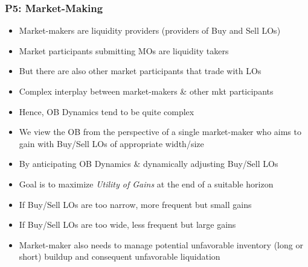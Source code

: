 \documentclass[handout]{beamer}
\begin{document}
\begin{frame}
\frametitle{P5: Market-Making}
\pause
\begin{itemize}[<+->]
\item Market-makers are liquidity providers (providers of Buy and Sell LOs)
\item Market participants submitting MOs are liquidity takers
\item But there are also other market participants that trade with LOs
\item Complex interplay between market-makers \& other mkt participants
\item Hence, OB Dynamics tend to be quite complex
\item We view the OB from the perspective of a single market-maker who aims to gain with Buy/Sell LOs of appropriate width/size
\item By anticipating OB Dynamics \& dynamically adjusting Buy/Sell LOs
\item Goal is to maximize {\em Utility of Gains} at the end of a suitable horizon
\item If Buy/Sell LOs are too narrow, more frequent but small gains
\item If Buy/Sell LOs are too wide, less frequent but large gains
\item Market-maker also needs to manage potential unfavorable inventory (long or short) buildup and consequent unfavorable liquidation
\end{itemize}
\end{frame}
\end{document}
